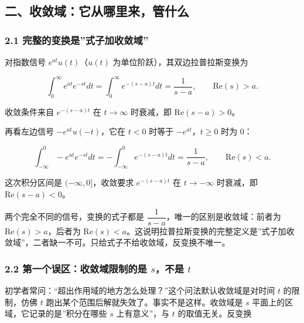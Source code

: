 \documentclass[12pt]{ctexart}
\begin{document}
\hypertarget{ux4e8cux6536ux655bux57dfux5b83ux4eceux54eaux91ccux6765ux7ba1ux4ec0ux4e48}{%
\subsection{二、收敛域：它从哪里来，管什么}\label{ux4e8cux6536ux655bux57dfux5b83ux4eceux54eaux91ccux6765ux7ba1ux4ec0ux4e48}}

\hypertarget{ux5b8cux6574ux7684ux53d8ux6362ux662fux5f0fux5b50ux52a0ux6536ux655bux57df}{%
\subsubsection{2.1
完整的变换是''式子加收敛域''}\label{ux5b8cux6574ux7684ux53d8ux6362ux662fux5f0fux5b50ux52a0ux6536ux655bux57df}}

对指数信号 \(e^{at}u(t)\)（\(u(t)\) 为单位阶跃），其双边拉普拉斯变换为

\[
\int_{0}^{\infty}e^{at}e^{-st}dt=\int_{0}^{\infty}e^{-(s-a)t}dt=\frac{1}{s-a},\qquad \mathrm{Re}(s)>a.
\]

收敛条件来自 \(e^{-(s-a)t}\) 在 \(t\to\infty\) 时衰减，即
\(\mathrm{Re}(s-a)>0\)。

再看左边信号 \(-e^{at}u(-t)\)，它在 \(t<0\) 时等于
\(-e^{at}\)，\(t\ge 0\) 时为 \(0\)：

\[
\int_{-\infty}^{0}-e^{at}e^{-st}dt=-\int_{-\infty}^{0}e^{-(s-a)t}dt=\frac{1}{s-a},\qquad \mathrm{Re}(s)<a.
\]

这次积分区间是 \((-\infty,0]\)，收敛要求 \(e^{-(s-a)t}\) 在
\(t\to-\infty\) 时衰减，即 \(\mathrm{Re}(s-a)<0\)。

两个完全不同的信号，变换的式子都是
\(\dfrac{1}{s-a}\)，唯一的区别是收敛域：前者为
\(\mathrm{Re}(s)>a\)，后者为
\(\mathrm{Re}(s)<a\)。这说明拉普拉斯变换的完整定义是''式子加收敛域''，二者缺一不可。只给式子不给收敛域，反变换不唯一。

\hypertarget{ux7b2cux4e00ux4e2aux8befux533aux6536ux655bux57dfux9650ux5236ux7684ux662f-sux4e0dux662f-t}{%
\subsubsection{\texorpdfstring{2.2 第一个误区：收敛域限制的是
\(s\)，不是
\(t\)}{2.2 第一个误区：收敛域限制的是 s，不是 t}}\label{ux7b2cux4e00ux4e2aux8befux533aux6536ux655bux57dfux9650ux5236ux7684ux662f-sux4e0dux662f-t}}

初学者常问：``超出作用域的地方怎么处理？''这个问法默认收敛域是对时间
\(t\) 的限制，仿佛 \(t\)
跑出某个范围后解就失效了。事实不是这样。收敛域是 \(s\)
平面上的区域，它记录的是''积分在哪些 \(s\) 上有意义''，与 \(t\)
的取值无关。反变换
\end{document}
